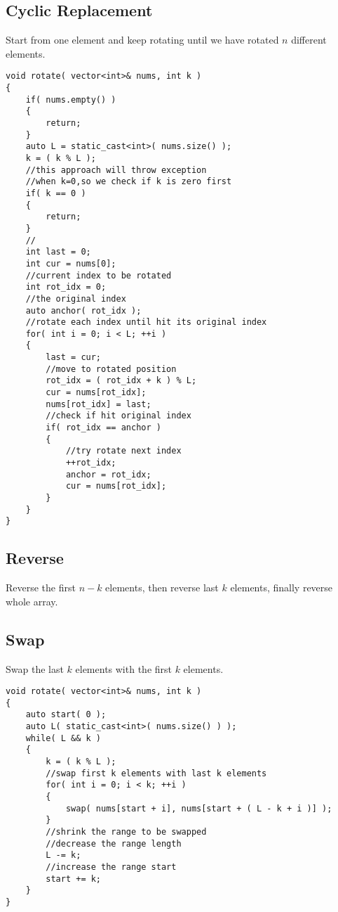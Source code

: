 \subsection{Cyclic Replacement}
Start from one element and keep rotating until we have rotated $n$ different elements.
\setcounter{lstlisting}{0}
\begin{lstlisting}[style=customc, caption={Cyclic Replacement Code}]
void rotate( vector<int>& nums, int k )
{
    if( nums.empty() )
    {
        return;
    }
    auto L = static_cast<int>( nums.size() );
    k = ( k % L );
    //this approach will throw exception
    //when k=0,so we check if k is zero first
    if( k == 0 )
    {
        return;
    }
    //
    int last = 0;
    int cur = nums[0];
    //current index to be rotated
    int rot_idx = 0;
    //the original index
    auto anchor( rot_idx );
    //rotate each index until hit its original index
    for( int i = 0; i < L; ++i )
    {
        last = cur;
        //move to rotated position
        rot_idx = ( rot_idx + k ) % L;
        cur = nums[rot_idx];
        nums[rot_idx] = last;
        //check if hit original index
        if( rot_idx == anchor )
        {
            //try rotate next index
            ++rot_idx;
            anchor = rot_idx;
            cur = nums[rot_idx];
        }
    }
}
\end{lstlisting}
\subsection{Reverse}
Reverse the first $n-k$ elements, then reverse last $k$ elements, finally reverse whole array.

\subsection{Swap}
Swap the last $k$ elements with the first $k$ elements.

\begin{lstlisting}[style=customc, caption={Swap}]
void rotate( vector<int>& nums, int k )
{
    auto start( 0 );
    auto L( static_cast<int>( nums.size() ) );
    while( L && k )
    {
        k = ( k % L );
        //swap first k elements with last k elements
        for( int i = 0; i < k; ++i )
        {
            swap( nums[start + i], nums[start + ( L - k + i )] );
        }
        //shrink the range to be swapped
        //decrease the range length
        L -= k;
        //increase the range start
        start += k;
    }
}
\end{lstlisting}